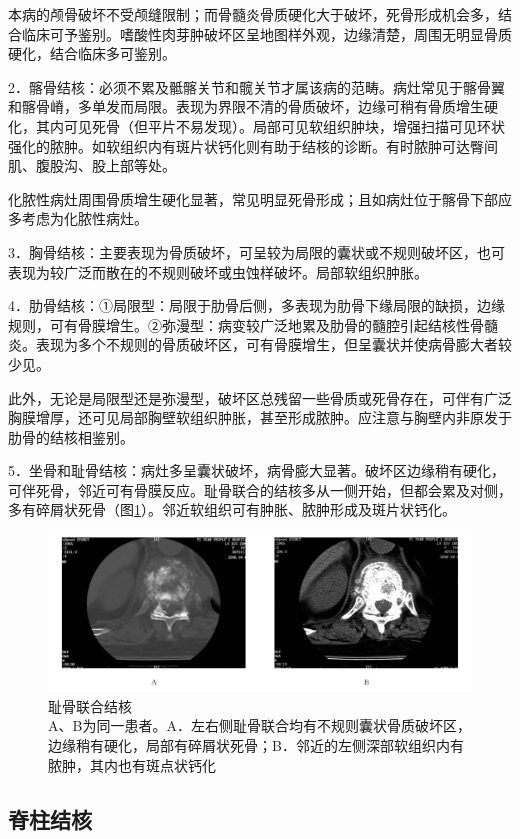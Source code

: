 本病的颅骨破坏不受颅缝限制；而骨髓炎骨质硬化大于破坏，死骨形成机会多，结合临床可予鉴别。嗜酸性肉芽肿破坏区呈地图样外观，边缘清楚，周围无明显骨质硬化，结合临床多可鉴别。

2．髂骨结核：必须不累及骶髂关节和髋关节才属该病的范畴。病灶常见于髂骨翼和髂骨嵴，多单发而局限。表现为界限不清的骨质破坏，边缘可稍有骨质增生硬化，其内可见死骨（但平片不易发现）。局部可见软组织肿块，增强扫描可见环状强化的脓肿。如软组织内有斑片状钙化则有助于结核的诊断。有时脓肿可达臀间肌、腹股沟、股上部等处。

化脓性病灶周围骨质增生硬化显著，常见明显死骨形成；且如病灶位于髂骨下部应多考虑为化脓性病灶。

3．胸骨结核：主要表现为骨质破坏，可呈较为局限的囊状或不规则破坏区，也可表现为较广泛而散在的不规则破坏或虫蚀样破坏。局部软组织肿胀。

4．肋骨结核：①局限型：局限于肋骨后侧，多表现为肋骨下缘局限的缺损，边缘规则，可有骨膜增生。②弥漫型：病变较广泛地累及肋骨的髓腔引起结核性骨髓炎。表现为多个不规则的骨质破坏区，可有骨膜增生，但呈囊状并使病骨膨大者较少见。

此外，无论是局限型还是弥漫型，破坏区总残留一些骨质或死骨存在，可伴有广泛胸膜增厚，还可见局部胸壁软组织肿胀，甚至形成脓肿。应注意与胸壁内非原发于肋骨的结核相鉴别。

5．坐骨和耻骨结核：病灶多呈囊状破坏，病骨膨大显著。破坏区边缘稍有硬化，可伴死骨，邻近可有骨膜反应。耻骨联合的结核多从一侧开始，但都会累及对侧，多有碎屑状死骨（图\ref{fig22-13}）。邻近软组织可有肿胀、脓肿形成及斑片状钙化。

\begin{figure}[!htbp]
 \centering
 \includegraphics[width=.7\textwidth,height=\textheight,keepaspectratio]{./images/Image00429.jpg}
 \captionsetup{justification=centering}
 \caption{耻骨联合结核\\{\small A、B为同一患者。A．左右侧耻骨联合均有不规则囊状骨质破坏区，边缘稍有硬化，局部有碎屑状死骨；B．邻近的左侧深部软组织内有脓肿，其内也有斑点状钙化}}
 \label{fig22-13}
  \end{figure} 

\subsection{脊柱结核}

